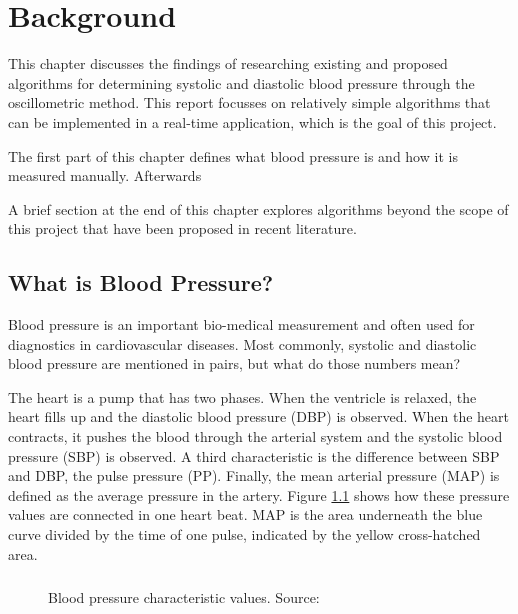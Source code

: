 \chapter{Background}\label{cp:theory} %
This chapter discusses the findings of researching existing and proposed algorithms for determining systolic and diastolic blood pressure through the oscillometric method. This report focusses on relatively simple algorithms that can be implemented in a real-time application, which is the goal of this project.

The first part of this chapter defines what blood pressure is and how it is measured manually. Afterwards 

A brief section at the end of this chapter explores algorithms beyond the scope of this project that have been proposed in recent literature.

\section{What is Blood Pressure?}
Blood pressure is an important bio-medical measurement and often used for  diagnostics in cardiovascular diseases. Most commonly, systolic and diastolic blood pressure are mentioned in pairs, but what do those numbers mean?

The heart is a pump that has two phases. When the ventricle is relaxed, the heart fills up and the diastolic blood pressure (DBP) is observed. When the heart contracts, it pushes the blood through the arterial system and the systolic blood pressure (SBP) is observed. A third characteristic is the difference between SBP and DBP, the pulse pressure (PP). Finally, the mean arterial pressure (MAP) is defined as the average pressure in the artery. Figure \ref{fig:BP} shows how these pressure values are connected in one heart beat. MAP is the area underneath the blue curve divided by the time of one pulse, indicated by the yellow cross-hatched area. \cite{Boron2012}\paragraph{}

\begin{figure}[]
\centering
\caption{Blood pressure characteristic values. Source: \cite{Boron2012}}
\label{fig:BP}
\end{figure}


